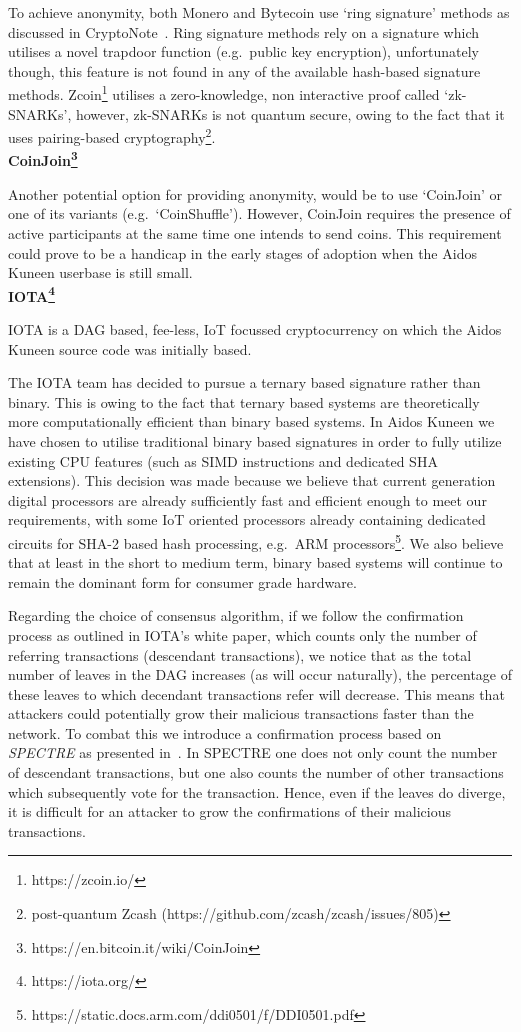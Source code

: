 \documentclass[a4paper,10pt,twocolumn]{article}
\begin{document}
To achieve anonymity, both Monero and Bytecoin use `ring signature' methods as discussed in CryptoNote~\cite{ringsig}. Ring signature 
methods rely on a signature which utilises a novel trapdoor function (e.g.\ public key encryption), unfortunately though, this feature is 
not found in any of the available hash-based signature methods. Zcoin\footnote{https://zcoin.io/} utilises a zero-knowledge, non interactive proof called `zk-SNARKs', however, zk-SNARKs is not quantum secure, owing to the fact that it uses pairing-based 
cryptography\footnote{post-quantum Zcash (https://github.com/zcash/zcash/issues/805)}. 
\\

\noindent
{\bf CoinJoin\footnote{https://en.bitcoin.it/wiki/CoinJoin}}

Another potential option for providing anonymity, would be to use `CoinJoin' or one of its variants (e.g.\ `CoinShuffle'). However, 
CoinJoin requires the presence of active participants at the same time one intends to send coins. This requirement could prove to be a 
handicap in the early stages of adoption when the Aidos Kuneen userbase is still small. 
\\

\noindent
{\bf IOTA\footnote{https://iota.org/}}

IOTA is a DAG based, fee-less, IoT focussed cryptocurrency on which the Aidos Kuneen source code was initially based. 

The IOTA team has decided to pursue a ternary based signature rather than binary. This is owing to the fact that ternary based 
systems are theoretically more computationally efficient than binary based systems. In Aidos Kuneen we have chosen to utilise 
traditional binary based signatures in order to fully utilize existing CPU features (such as SIMD instructions and dedicated SHA 
extensions). This decision was made because we believe that current generation digital processors are already sufficiently fast and 
efficient enough to meet our requirements, with some IoT oriented processors already containing dedicated circuits for 
SHA-2 based hash processing, e.g.~ARM processors\footnote{https://static.docs.arm.com/ddi0501/f/DDI0501.pdf}. We also believe that at 
least in the short to medium term, binary based systems will continue to remain the dominant form for consumer grade hardware.

Regarding the choice of consensus algorithm, if we follow the confirmation process as outlined in IOTA's white paper, which counts only the number of referring transactions 
(descendant transactions), we notice that as the total number of leaves in the DAG increases (as will occur naturally), 
the percentage of these leaves to which decendant transactions refer will decrease.
This means that attackers could potentially grow their malicious
transactions faster than the network. To combat this we introduce a confirmation process based on \emph{SPECTRE} as presented 
in~\cite{spectre}. In SPECTRE one does not only count the number of descendant transactions, but one also counts the number of other 
transactions which subsequently vote for the transaction. Hence, even if the leaves do diverge, it is difficult for an attacker to grow 
the confirmations of their malicious transactions.
\end{document}
